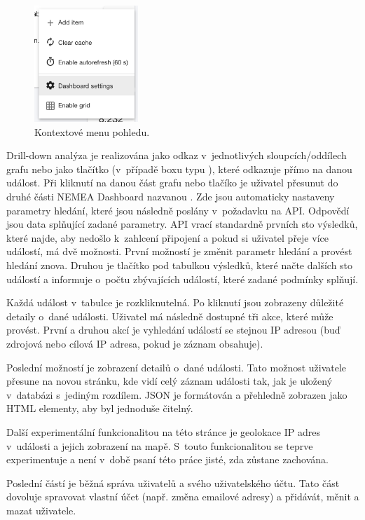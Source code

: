 \begin{figure}[ht]
    \centering
    \includegraphics[width=0.35\textwidth]{fig/dashboard_menu.png}
    \caption{Kontextové menu pohledu.} \label{fig:dashboard_menu}
\end{figure}

Drill-down analýza je realizována jako odkaz v~jednotlivých sloupcích/oddílech grafu nebo jako tlačítko (v~případě boxu typu ), které odkazuje přímo na danou událost. Při kliknutí na danou část grafu nebo tlačíko je uživatel přesunut do druhé části NEMEA Dashboard nazvanou . Zde jsou automaticky nastaveny parametry hledání, které jsou následně poslány v~požadavku na API. Odpovědí jsou data splňující zadané parametry. API vrací standardně prvních sto výsledků, které najde, aby nedošlo k~zahlcení připojení a pokud si uživatel přeje více událostí, má dvě možnosti. První možností je změnit parametr hledání a provést hledání znova.  Druhou je tlačítko pod tabulkou výsledků, které načte dalších sto událostí a informuje o~počtu zbývajících událostí, které zadané podmínky splňují.

Každá událost v~tabulce je rozkliknutelná. Po kliknutí jsou zobrazeny důležité detaily o~dané události. Uživatel má následně dostupné tři akce, které může provést. První a druhou akcí je vyhledání událostí se stejnou IP adresou (buď zdrojová nebo cílová IP adresa, pokud je záznam obsahuje).

Poslední možností je zobrazení detailů o~dané události. Tato možnost uživatele přesune na novou stránku, kde vidí celý záznam události tak, jak je uložený v~databázi s~jediným rozdílem. JSON je formátován a přehledně zobrazen jako HTML elementy, aby byl jednoduše čitelný.

Další experimentální funkcionalitou na této stránce je geolokace IP adres v~události a jejich zobrazení na mapě. S~touto funkcionalitou se teprve experimentuje a není v~době psaní této práce jisté, zda zůstane zachována.

Poslední částí je běžná správa uživatelů a svého uživatelského účtu. Tato část dovoluje spravovat vlastní účet (např. změna emailové adresy) a přidávát, měnit a mazat uživatele.


